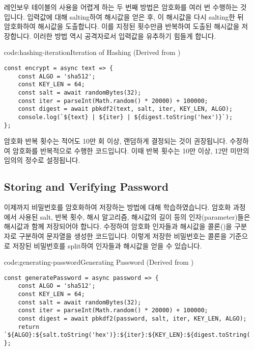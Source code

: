 레인보우 테이블의 사용을 어렵게 하는 두 번째 방법은 암호화를 여러 번 수행하는 것입니다. 입력값에 대해 salting하여 해시값을 얻은 후, 이 해시값을 다시 salting한 뒤 암호화하여 해시값을 도출합니다. 이를 지정된 횟수만큼 반복하여 도출된 해시값을 저장합니다. 이러한 방법 역시 공격자로서 입력값을 유추하기 힘들게 합니다.

\begin{codeenv}{code:hashing-iteration}{Iteration of Hashing (Derived from )}\begin{verbatim}
const encrypt = async text => {
    const ALGO = 'sha512';
    const KEY_LEN = 64;
    const salt = await randomBytes(32);
    const iter = parseInt(Math.random() * 20000) + 100000;
    const digest = await pbkdf2(text, salt, iter, KEY_LEN, ALGO);
    console.log(`${text} | ${iter} | ${digest.toString('hex')}`);
};
\end{verbatim}
\end{codeenv}

암호화 반복 횟수는 적어도 10만 회 이상, 랜덤하게 결정되는 것이 권장됩니다. \은 \을 수정하여 암호화를 반복적으로 수행한 코드입니다. 이때 반복 횟수는 10만 이상, 12만 미만의 임의의 정수로 설정됩니다.

\subsection*{Storing and Verifying Password}

이제까지 비밀번호를 암호화하여 저장하는 방법에 대해 학습하였습니다. 암호화 과정에서 사용된 salt, 반복 횟수, 해시 알고리즘, 해시값의 길이 등의 인자(parameter)들은 해시값과 함께 저장되어야 합니다. \는 \을 수정하여 암호화 인자들과 해시값을 콜론(\cd{:})을 구분자로 구분하여 문자열을 생성한 코드입니다. 이렇게 저장한 비밀번호는 콜론을 기준으로 저장된 비밀번호를 split하여 인자들과 해시값을 얻을 수 있습니다.

\begin{codeenv}{code:generating-password}{Generating Password (Derived from )}\begin{verbatim}
const generatePassword = async password => {
    const ALGO = 'sha512';
    const KEY_LEN = 64;
    const salt = await randomBytes(32);
    const iter = parseInt(Math.random() * 20000) + 100000;
    const digest = await pbkdf2(password, salt, iter, KEY_LEN, ALGO);
    return `${ALGO}:${salt.toString('hex')}:${iter}:${KEY_LEN}:${digest.toString('hex')}`;
};
\end{verbatim}
\end{codeenv}

